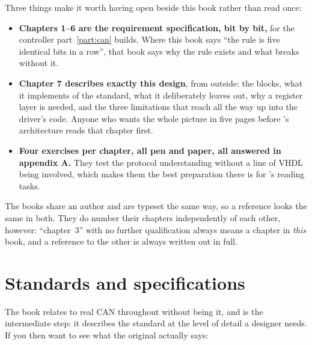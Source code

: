 Three things make it worth having open beside this book rather than read once:

\begin{itemize}
  \item \textbf{Chapters 1--6 are the requirement specification, bit by bit,} for the controller
    part~\ref{part:can} builds. Where this book says ``the rule is five identical bits in a row'',
    that book says why the rule exists and what breaks without it.
  \item \textbf{Chapter 7 describes exactly this design}, from outside: the blocks, what it
    implements of the standard, what it deliberately leaves out, why a register layer is needed, and
    the three limitations that reach all the way up into the driver's code. Anyone who wants the whole
    picture in five pages before 's architecture reads that chapter first.
  \item \textbf{Four exercises per chapter, all pen and paper, all answered in appendix A.} They test
    the protocol understanding without a line of VHDL being involved, which makes them the best
    preparation there is for 's reading tasks.
\end{itemize}

The books share an author and are typeset the same way, so a reference looks the same in both. They do
number their chapters independently of each other, however: ``chapter~3'' with no further
qualification always means a chapter in \emph{this} book, and a reference to the other is always
written out in full.

\section{Standards and specifications}
\label{app:reading:specs}

The book relates to real CAN throughout without being it, and \canbook{} is the intermediate step:
it describes the standard at the level of detail a designer needs. If you then want to see what the
original actually says:


